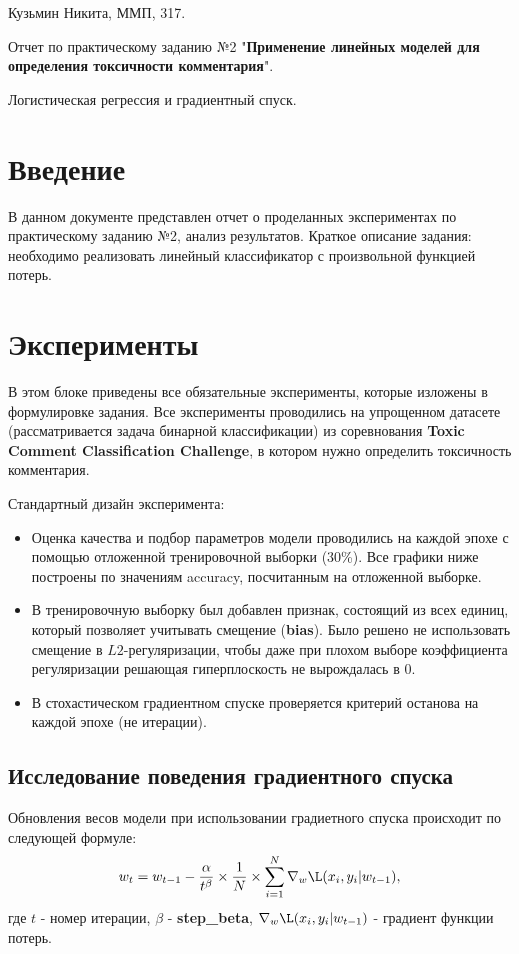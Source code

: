 \documentclass[a4paper, 11pt]{article}
\begin{document}
    \hfill Кузьмин Никита, ММП, 317.
    
    \begin{center} \Large Отчет по практическому заданию №2 "\textbf{Применение линейных моделей для определения токсичности комментария}". 
    
    Логистическая регрессия и градиентный спуск.
    \tableofcontents
    \end{center}
    
    \newpage
    \section{Введение}
    
    В данном документе представлен отчет о проделанных экспериментах по практическому заданию №2, анализ результатов. 
    Краткое описание задания: необходимо реализовать линейный классификатор с произвольной функцией потерь.
    
    \section{Эксперименты}
    В этом блоке приведены все обязательные эксперименты, которые изложены в формулировке задания.
    Все эксперименты проводились на упрощенном датасете (рассматривается задача бинарной классификации) из соревнования \textbf{Toxic Comment Classification Challenge}, в котором нужно определить токсичность комментария. 
    
    Стандартный дизайн эксперимента: 
    \begin{itemize}
        \item Оценка качества и подбор параметров модели проводились на каждой эпохе с помощью отложенной тренировочной выборки (30\%). Все графики ниже построены по значениям accuracy, посчитанным на отложенной выборке.
        \item В тренировочную выборку был добавлен признак, состоящий из всех единиц, который позволяет учитывать смещение (\textbf{bias}). Было решено не использовать смещение в $L2$-регуляризации, чтобы даже при плохом выборе коэффициента регуляризации решающая гиперплоскость не вырождалась в 0.
        \item В стохастическом градиентном спуске проверяется критерий останова на каждой эпохе (не итерации).
    \end{itemize}

        \subsection{Исследование поведения градиентного спуска}
            Обновления весов модели при использовании градиетного спуска происходит по следующей формуле:
            \begin{equation}\label{exp1:weight_upd}
            w_t = w_{t-1} - \frac{\alpha}{t^\beta} \times \frac{1}{N} \times \sum_{i=1}^{N}\nabla_{w}\L(x_i, y_i|w_{t-1}),
            \end{equation}
            где $t$ - номер итерации, $\beta$ - \textbf{step\_beta}, $\nabla_{w}\L(x_i, y_i|w_{t-1})$ - градиент функции потерь.
\end{document}
